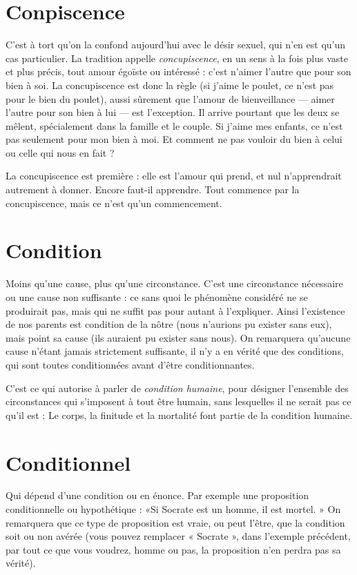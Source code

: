 \section{Conpiscence}
C’est à tort qu’on la confond aujourd’hui avec le
désir sexuel, qui n’en est qu’un cas particulier. La tradition
appelle {\it concupiscence}, en un sens à la fois plus vaste et plus précis, tout
amour égoïste ou intéressé : c’est n’aimer l’autre que pour son bien à soi. La
concupiscence est donc la règle (si j'aime le poulet, ce n’est pas pour le bien du
poulet), aussi sûrement que l’amour de bienveillance — aimer l’autre pour son
bien à lui — est l’exception. Il arrive pourtant que les deux se mêlent, spécialement
dans la famille et le couple. Si j’aime mes enfants, ce n’est pas seulement
pour mon bien à moi. Et comment ne pas vouloir du bien à celui ou celle qui
nous en fait ?

La concupiscence est première : elle est l’amour qui prend, et nul n’apprendrait
autrement à donner. Encore faut-il apprendre. Tout commence par la
concupiscence, mais ce n’est qu'un commencement.

\section{Condition}
Moins qu’une cause, plus qu’une circonstance. C’est une
circonstance nécessaire ou une cause non suffisante : ce sans
quoi le phénomène considéré ne se produirait pas, mais qui ne suffit pas pour
autant à l'expliquer. Ainsi l’existence de nos parents est condition de la nôtre
(nous n’aurions pu exister sans eux), mais point sa cause (ils auraient pu exister
sans nous). On remarquera qu'aucune cause n'étant jamais strictement suffisante,
il n’y a en vérité que des conditions, qui sont toutes conditionnées avant
d’être conditionnantes.

C’est ce qui autorise à parler de {\it condition humaine}, pour désigner
l’ensemble des circonstances qui s'imposent à tout être humain, sans lesquelles
il ne serait pas ce qu’il est : Le corps, la finitude et la mortalité font partie de la
condition humaine.

\section{Conditionnel}
Qui dépend d’une condition ou en énonce. Par exemple
une proposition conditionnelle ou hypothétique : «Si
Socrate est un homme, il est mortel. » On remarquera que ce type de proposition
est vraie, ou peut l’être, que la condition soit ou non avérée (vous pouvez
remplacer « Socrate », dans l'exemple précédent, par tout ce que vous voudrez,
homme ou pas, la proposition n’en perdra pas sa vérité).

